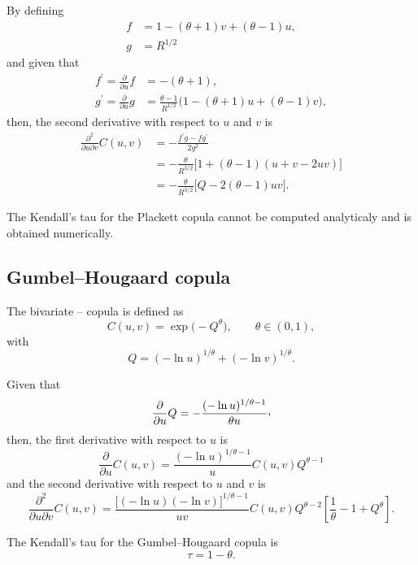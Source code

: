 \documentclass{article}
\def\ccom{\raisebox{.45ex}{\textrm{,}}}
\begin{document}
By defining
\begin{align}
    f &= 1 - (\theta+1) v + (\theta-1) u,\\
    g &= R^{1/2}
\end{align}
and given that
\begin{align}
    f^\prime = \frac{\partial}{\partial u} f &= -(\theta + 1),\\
    g^\prime = \frac{\partial}{\partial u} g &= \frac{\theta-1}{R^{1/2}} \Big(
        1 - (\theta+1) u + (\theta-1) v \Big),
\end{align}
then, the second derivative with respect to $u$ and $v$ is 
\begin{align}
    \frac{\partial^2}{\partial u\partial v}C(u,v)
        &= - \frac{f^\prime g - fg^\prime}{2 g^2}
        \nonumber\\
        &= - \frac\theta{R^{3/2}}\Big[
            1 + (\theta-1)(u+v-2uv)\Big]
        \nonumber\\
        &= - \frac\theta{R^{3/2}}\Big[
            Q - 2(\theta-1)uv\Big].
\end{align}

The Kendall's tau for the Plackett copula cannot be computed analyticaly
  and is obtained numerically.




\subsection*{Gumbel--Hougaard copula}
The bivariate \cite{Gumbel60}--\cite{Hougaard86} copula is defined as
\begin{equation}
    C(u,v)= \exp\Big(-Q^\theta \Big), \qquad \theta \in (0, 1),
\end{equation}
with 
\begin{equation}
    Q= (- \ln u)^{1/\theta} + (- \ln v)^{1/\theta}.
\end{equation}

Given that
\begin{equation}
    \frac{\partial}{\partial u}Q
        = -\frac{(- \ln u)^{1/\theta-1}}{\theta u}\ccom
\end{equation}
then, the first derivative with respect to $u$ is 
\begin{equation}
    \frac{\partial}{\partial u}C(u,v)
    = \frac{ (-\ln u)^{1/\theta - 1} }u C(u, v) Q^{\theta-1}
\end{equation}
and the second derivative with respect to $u$ and $v$ is 
\begin{equation}
    \frac{\partial^2}{\partial u\partial v}C(u,v)
        = \frac{ \Big[ (-\ln u)(-\ln v) \Big]^{1/\theta - 1} }{uv}
            C(u, v) Q^{\theta-2}
            \left[\frac1\theta -1 + Q^\theta\right].
\end{equation}

The Kendall's tau for the Gumbel--Hougaard copula is
\begin{equation}
    \tau = 1 - \theta.
\end{equation}

\nocite{Nelsen06}


{}
\end{document}
